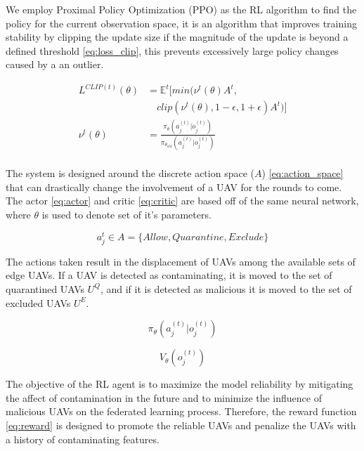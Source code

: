 \documentclass[10pt,journal,compsoc]{IEEEtran}
\begin{document}
We employ Proximal Policy Optimization (PPO) \cite{ppo} as the RL algorithm to find the policy for the current observation space, it is an algorithm that improves training stability by clipping the update size if the magnitude of the update is beyond a defined threshold \eqref{eq:loss_clip}, this prevents excessively large policy changes caused by a an outlier.

\begin{align}\label{eq:loss_clip}
L^{CLIP (t)}(\theta)
&=
\mathbb{E}^t[
min(\nu^t(\theta) A^t,
\\ 
&\quad \nonumber
clip(\nu^t(\theta),
1-\epsilon,
1+\epsilon
)A^t
)
]
\\
\nu^t(\theta)
&=
\frac
 {\pi_\theta(a_j^{(t)}|o_j^{(t)})}
 {\pi_{\theta_{old}}(a_j^{(t)}|o_j^{(t)})}
 \\ \nonumber
\end{align}

The system is designed around the discrete action space ($A$) \eqref{eq:action_space} that can drastically change the involvement of a UAV for the rounds to come.
The actor \eqref{eq:actor} and critic \eqref{eq:critic} are based off of the same neural network, where $\theta$ is used to denote set of it's parameters.

\begin{equation}\label{eq:action_space}
a_j^{t} \in A 
= 
\{Allow, Quarantine, Exclude\}
\end{equation}

The actions taken result in the displacement of UAVs among the available sets of edge UAVs. If a UAV is detected as contaminating, it is moved to the set of quarantined UAVs $U^Q$, and if it is detected as malicious it is moved to the set of excluded UAVs $U^E$.

\begin{equation}\label{eq:actor}
 \pi_\theta(a_j^{(t)}|o_j^{(t)})
\end{equation}


\begin{equation}\label{eq:critic}
V_\theta(o_j^{(t)})
\end{equation}

The objective of the RL agent is to maximize the model reliability by mitigating the affect of contamination in the future and to minimize the influence of malicious UAVs on the federated learning process. Therefore, the reward function \eqref{eq:reward} is designed to promote the reliable UAVs and penalize the UAVs with a history of contaminating features.
\end{document}
